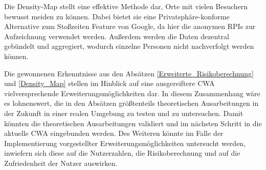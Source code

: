 \documentclass[conference,compsoc]{IEEEtran}
\begin{document}
Die Density-Map stellt eine effektive Methode dar, Orte mit vielen Besuchern bewusst meiden zu können.
Dabei bietet sie eine Privatsphäre-konforme Alternative zum Stoßzeiten Feature von Google, da hier die anonymen RPIs zur Aufzeichnung verwendet werden. 
Außerdem werden die Daten dezentral gebündelt und aggregiert, wodurch einzelne Personen nicht nachverfolgt werden können. 

Die gewonnenen Erkenntnisse aus den Absätzen \ref{Erweiterte_Risikoberechnung} und \ref{Density_Map} stellen im Hinblick auf eine ausgereiftere CWA vielversprechende Erweiterungsmöglichkeiten dar. 
In diesem Zusammenhang wäre es lohnenswert, die in den Absätzen größtenteils theoretischen Ausarbeitungen in der Zukunft in einer realen Umgebung zu testen und zu untersuchen. 
Damit könnten die theoretischen Ausarbeitungen validiert und im nächsten Schritt in die aktuelle CWA eingebunden werden.
Des Weiteren könnte im Falle der Implementierung vorgestellter Erweiterungsmöglichkeiten untersucht werden, inwiefern sich diese auf die Nutzerzahlen, die Risikoberechnung und auf die Zufriedenheit der Nutzer auswirken. 
\end{document}
